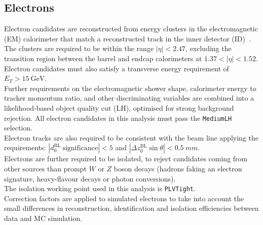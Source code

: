 \subsection{Electrons}
\label{sec:object:el}
Electron candidates are reconstructed from energy clusters in the
electromagnetic (EM) calorimeter that match a reconstructed track in
the inner detector (ID)~\cite{ATL-PHYS-PUB-2015-041,ATL-PHYS-PUB-2016-015,ATLAS-CONF-2016-024,PERF-2017-01}.
The clusters are required to be within the range $|\eta| < 2.47$,
excluding the transition region between the barrel and endcap calorimeters at 
$1.37 < |\eta| < 1.52$. 
Electron candidates must also satisfy a
transverse energy requirement of $E_{T} >\SI{15}{\GeV}$. \\
Further requirements on the electromagnetic shower shape, calorimeter
energy to tracker momentum ratio, and other discriminating variables
are combined into a likelihood-based object quality cut (LH), optimised for
strong background rejection. All electron candidates in this analysis
must pass the \texttt{MediumLH} selection.\\
Electron tracks are also required to be consistent with the beam line 
applying the requirements: 
$|d_0^\mathrm{BL}~\mathrm{significance} | < 5$ and 
$|\Delta z_0^\mathrm{BL} \sin\theta| < \SI{0.5}{mm}$. \\
Electrons are further required to be isolated, to reject
candidates coming from other sources than prompt $W$ or
$Z$ boson decays (hadrons faking an electron signature,
heavy-flavour decays or photon conversions). \\
The isolation working point used in this analysis is \texttt{PLVTight}. \\
Correction factors are applied to simulated electrons to take into account the small differences in
reconstruction, identification and isolation efficiencies between data and MC simulation.

\FloatBarrier
